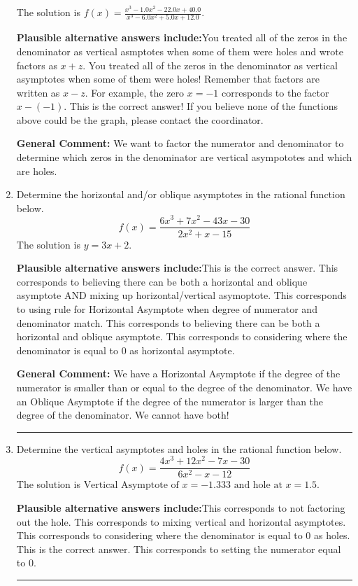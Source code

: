 \documentclass{extbook}[14pt]
\newcommand{\litem}[1]{\item #1

\rule{\textwidth}{0.4pt}}
\begin{document}
\begin{enumerate}
{The solution is \( f(x)=\frac{x^{3} -1.0 x^{2} -22.0 x + 40.0}{x^{3} -6.0 x^{2} +5.0 x + 12.0} \).\begin{enumerate}[label=\Alph*.]
\textbf{Plausible alternative answers include:}You treated all of the zeros in the denominator as vertical asmptotes when some of them were holes and wrote factors as $x+z$.
You treated all of the zeros in the denominator as vertical asymptotes when some of them were holes!
Remember that factors are written as $x-z$. For example, the zero $x=-1$ corresponds to the factor $x-(-1)$.
This is the correct answer!
If you believe none of the functions above could be the graph, please contact the coordinator.
\end{enumerate}

\textbf{General Comment:} We want to factor the numerator and denominator to determine which zeros in the denominator are vertical asympototes and which are holes.
}
\litem{
Determine the horizontal and/or oblique asymptotes in the rational function below.
\[ f(x) = \frac{6x^{3} +7 x^{2} -43 x -30}{2x^{2} +x -15} \]The solution is \( y = 3x + 2 \).\begin{enumerate}[label=\Alph*.]
\textbf{Plausible alternative answers include:}This is the correct answer.
This corresponds to believing there can be both a horizontal and oblique asymptote AND mixing up horizontal/vertical asymoptote.
This corresponds to using rule for Horizontal Asymptote when degree of numerator and denominator match.
This corresponds to believing there can be both a horizontal and oblique asymptote.
This corresponds to considering where the denominator is equal to 0 as horizontal asymptote.
\end{enumerate}

\textbf{General Comment:} We have a Horizontal Asymptote if the degree of the numerator is smaller than or equal to the degree of the denominator. We have an Oblique Asymptote if the degree of the numerator is larger than the degree of the denominator. We cannot have both!
}
\litem{
Determine the vertical asymptotes and holes in the rational function below.
\[ f(x) = \frac{4x^{3} +12 x^{2} -7 x -30}{6x^{2} -x -12} \]The solution is \( \text{Vertical Asymptote of } x = -1.333 \text{ and hole at } x = 1.5 \).\begin{enumerate}[label=\Alph*.]
\textbf{Plausible alternative answers include:}This corresponds to not factoring out the hole.
This corresponds to mixing vertical and horizontal asymptotes.
This corresponds to considering where the denominator is equal to 0 as holes.
This is the correct answer.
This corresponds to setting the numerator equal to 0.
\end{enumerate}

}
\end{enumerate}
\end{document}
